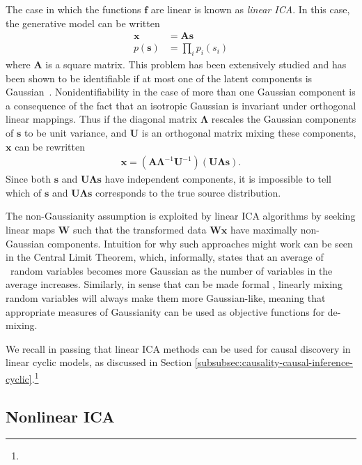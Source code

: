 The case in which the functions $\bm{f}$ are linear is known as \emph{linear ICA}. 
In this case, the generative model can be written
\begin{align*}
\bm{x} &= \bm{A}\bm{s} \\
p(\bm{s}) &= \prod_{i} p_i(s_i)
\end{align*}
where $\bm{A}$ is a square matrix.
This problem has been extensively studied and has been shown to be identifiable if at most one of the latent components is Gaussian~\citep{darmois1953analyse, skitovich1954linear, comon1994independent}.
Nonidentifiability in the case of more than one Gaussian component is a consequence of the fact that an isotropic Gaussian is invariant under orthogonal linear mappings.
Thus if the diagonal matrix $\bm{\Lambda}$ rescales the Gaussian components of $\bm{s}$ to be unit variance, and $\bm{U}$ is an orthogonal matrix mixing these components, $\bm{x}$ can be rewritten
%
\begin{align*}
\bm{x} = \left(\bm{A}\bm{\Lambda}^{-1}\bm{U}^{-1} \right) \left(\bm{U}\bm{\Lambda} \bm{s}\right).
\end{align*}
%
Since both $\bm{s}$ and $\bm{U}\bm{\Lambda} \bm{s}$ have independent components, it is impossible to tell which of $\bm{s}$ and $\bm{U}\bm{\Lambda} \bm{s}$ corresponds to the true source distribution. 

The non-Gaussianity assumption is exploited by linear ICA algorithms by seeking linear maps $\bm{W}$ such that the transformed data $\bm{W}\bm{x}$ have maximally non-Gaussian components.
Intuition for why such approaches might work can be seen in the Central Limit Theorem, which, informally, states that an average of \iid~random variables becomes more Gaussian as the number of variables in the average increases. 
Similarly, in sense that can be made formal \citep{hyvarinen2000independent}, linearly mixing random variables will always make them more Gaussian-like, meaning that appropriate measures of Gaussianity can be used as objective functions for de-mixing.

We recall in passing that linear ICA methods can be used for causal discovery in linear cyclic models, as discussed in Section \ref{subsubsec:causality-causal-inference-cyclic}.\footnote{}





\subsection{Nonlinear ICA}\label{subsec:ica-literature-nonlinear-ica}

